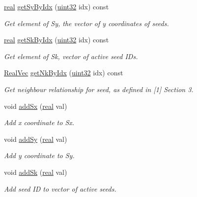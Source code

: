 \begin{DoxyCompactItemize}
\mbox{\hyperlink{typedefs_8h_a58a0c7cf2501f4492da833421be92547}{real}} \mbox{\hyperlink{classvd_a0f630fc80e57d3e17ab036f75afde006}{get\+Sy\+By\+Idx}} (\mbox{\hyperlink{typedefs_8h_a8ad23e2333787a214e20a58a284a5a60}{uint32}} idx) const
\begin{DoxyCompactList}\small\item\em Get element of Sy, the vector of y coordinates of seeds. \end{DoxyCompactList}\item 
\mbox{\hyperlink{typedefs_8h_a58a0c7cf2501f4492da833421be92547}{real}} \mbox{\hyperlink{classvd_a4d2c835e7804c4242dce6d411f01ce0a}{get\+Sk\+By\+Idx}} (\mbox{\hyperlink{typedefs_8h_a8ad23e2333787a214e20a58a284a5a60}{uint32}} idx) const
\begin{DoxyCompactList}\small\item\em Get element of Sk, vector of active seed I\+Ds. \end{DoxyCompactList}\item 
\mbox{\hyperlink{typedefs_8h_a84b6d9a0fbb45e01ad4a3aa5667f2992}{Real\+Vec}} \mbox{\hyperlink{classvd_a4d058d2d1d675a741a83776c95b2acfb}{get\+Nk\+By\+Idx}} (\mbox{\hyperlink{typedefs_8h_a8ad23e2333787a214e20a58a284a5a60}{uint32}} idx) const
\begin{DoxyCompactList}\small\item\em Get neighbour relationship for seed, as defined in \mbox{[}1\mbox{]} Section 3. \end{DoxyCompactList}\item 
void \mbox{\hyperlink{classvd_aa963b629bc4d1a6b52b0df7efae04da3}{add\+Sx}} (\mbox{\hyperlink{typedefs_8h_a58a0c7cf2501f4492da833421be92547}{real}} val)
\begin{DoxyCompactList}\small\item\em Add x coordinate to Sx. \end{DoxyCompactList}\item 
void \mbox{\hyperlink{classvd_ae15b2741f063cc113aaf7a23199a5efe}{add\+Sy}} (\mbox{\hyperlink{typedefs_8h_a58a0c7cf2501f4492da833421be92547}{real}} val)
\begin{DoxyCompactList}\small\item\em Add y coordinate to Sy. \end{DoxyCompactList}\item 
void \mbox{\hyperlink{classvd_a62112357c953c7dc77a4e3fb46aeaf9d}{add\+Sk}} (\mbox{\hyperlink{typedefs_8h_a58a0c7cf2501f4492da833421be92547}{real}} val)
\begin{DoxyCompactList}\small\item\em Add seed ID to vector of active seeds. \end{DoxyCompactList}\item 

\end{DoxyCompactItemize}
